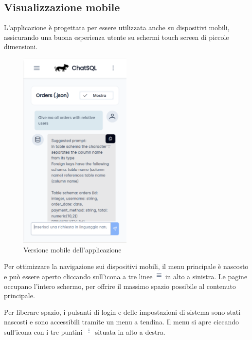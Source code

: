 \subsection{Visualizzazione mobile}

\par L'applicazione è progettata per essere utilizzata anche su dispositivi mobili, assicurando una buona esperienza utente su schermi touch screen di piccole dimensioni.

\begin{figure}[H]
  \centering
  \includegraphics[width=0.50\textwidth]{assets/mobile.png}
  \caption{Versione mobile dell'applicazione}
\end{figure}

\par Per ottimizzare la navigazione sui dispositivi mobili, il menu principale è nascosto e può essere aperto cliccando sull'icona a tre linee \includegraphics[height=1.2em]{assets/dd_burger_menu.png} in alto a sinistra. Le pagine occupano l'intero schermo, per offrire il massimo spazio possibile al contenuto principale.
\par Per liberare spazio, i pulsanti di login e delle impostazioni di sistema sono stati nascosti e sono accessibili tramite un menu a tendina. Il menu si apre ciccando sull'icona con i tre puntini \includegraphics[height=1.2em]{assets/dd_kebab_menu.png} situata in alto a destra.